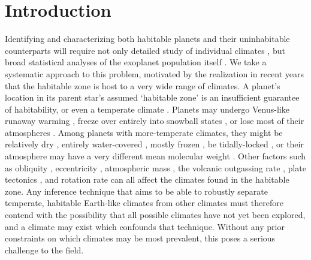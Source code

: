 \documentclass[fleqn,usenatbib]{mnras}
\begin{document}
\section{Introduction}
Identifying and characterizing both habitable planets and their uninhabitable counterparts will require not only detailed study of individual climates \citep{Arney2018,Ramirez2018,Quanz2019}, but broad statistical analyses of the exoplanet population itself \citep{Bean2017,Checlair2019}. We take a systematic approach to this problem, motivated by the realization in recent years that the habitable zone is host to a very wide range of climates. A planet's location in its parent star's assumed `habitable zone' is an insufficient guarantee of habitability, or even a temperate climate \citep{Ramirez2018a}. Planets may undergo Venus-like runaway warming \citep{Kasting1988,Nakajima1992}, freeze over entirely into snowball states \citep{Budyko1969,Caldeira1992}, or lose most of their atmospheres \citep{Lammer2008}. Among planets with more-temperate climates, they might be relatively dry \citep{Abe2011}, entirely water-covered \citep{Kite2018}, mostly frozen \citep{Paradise2017}, be tidally-locked \citep{Pierrehumbert2011}, or their atmosphere may have a very different mean molecular weight \citep{Koll2019}. Other factors such as obliquity \citep{Williams1997}, eccentricity \citep{Bolmont2016}, atmospheric mass \citep{Vladilo2013,Paradise2021}, the volcanic outgassing rate \citep{walker81}, plate tectonics \citep{Foley2019}, and rotation rate \citep{Abbot2018} can all affect the climates found in the habitable zone. Any inference technique that aims to be able to robustly separate temperate, habitable Earth-like climates from other climates must therefore contend with the possibility that all possible climates have not yet been explored, and a climate may exist which confounds that technique. Without any prior constraints on which climates may be most prevalent, this poses a serious challenge to the field.

\end{document}
